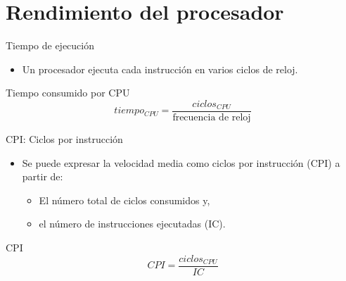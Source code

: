\section{Rendimiento del procesador}

\begin{frame}[t]{Tiempo de ejecución}
\begin{itemize}
  \item Un procesador ejecuta cada instrucción en varios ciclos de reloj.
\end{itemize}
\begin{block}{Tiempo consumido por CPU}
\begin{displaymath}
tiempo_{CPU} = 
\frac{ciclos_{CPU}}{\text{frecuencia de reloj}}
\end{displaymath}
\end{block}
\end{frame}

\begin{frame}[t]{CPI: Ciclos por instrucción}
  \begin{itemize}
    \item Se puede expresar la velocidad media como ciclos por instrucción (CPI) a partir de:
      \begin{itemize}
         \item El número total de ciclos consumidos y,
         \item el número de instrucciones ejecutadas (IC).
      \end{itemize}
  \end{itemize}
\begin{block}{CPI}
\begin{displaymath}
CPI =
\frac{ciclos_{CPU}}{IC}
\end{displaymath}
\end{block}
\end{frame}

